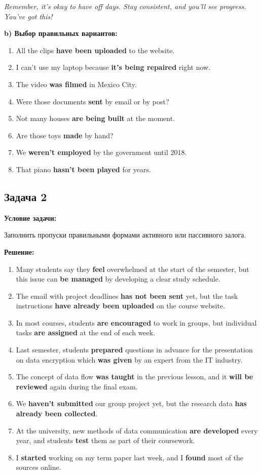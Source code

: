 \documentclass[a4paper,12pt]{article}
\begin{document}
\textit{Remember, it’s okay to have off days. Stay consistent, and you’ll see progress. You’ve got this!}  

\textbf{b) Выбор правильных вариантов:}

\begin{enumerate}
    \item All the clips \textbf{have been uploaded} to the website.
    \item I can’t use my laptop because \textbf{it’s being repaired} right now.
    \item The video \textbf{was filmed} in Mexico City.
    \item Were those documents \textbf{sent} by email or by post?
    \item Not many houses \textbf{are being built} at the moment.
    \item Are those toys \textbf{made} by hand?
    \item We \textbf{weren’t employed} by the government until 2018.
    \item That piano \textbf{hasn’t been played} for years.
\end{enumerate}

\vspace{1cm}

\subsection{Задача 2}
\textbf{Условие задачи:}

Заполнить пропуски правильными формами активного или пассивного залога.

\textbf{Решение:}

\begin{enumerate}
    \item Many students say they \textbf{feel} overwhelmed at the start of the semester, but this issue can \textbf{be managed} by developing a clear study schedule.
    \item The email with project deadlines \textbf{has not been sent} yet, but the task instructions \textbf{have already been uploaded} on the course website.
    \item In most courses, students \textbf{are encouraged} to work in groups, but individual tasks \textbf{are assigned} at the end of each week.
    \item Last semester, students \textbf{prepared} questions in advance for the presentation on data encryption which \textbf{was given} by an expert from the IT industry.
    \item The concept of data flow \textbf{was taught} in the previous lesson, and it \textbf{will be reviewed} again during the final exam.
    \item We \textbf{haven’t submitted} our group project yet, but the research data \textbf{has already been collected}.
    \item At the university, new methods of data communication \textbf{are developed} every year, and students \textbf{test} them as part of their coursework.
    \item I \textbf{started} working on my term paper last week, and I \textbf{found} most of the sources online.
\end{enumerate}

\vspace{1cm}
\end{document}
